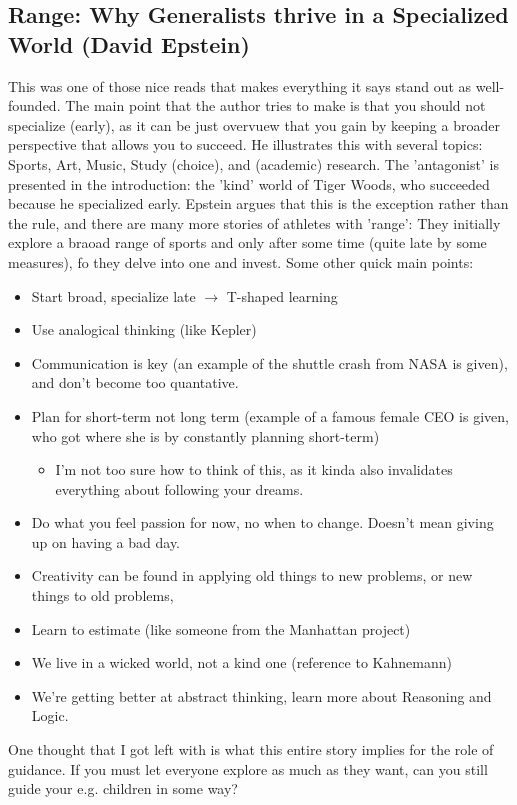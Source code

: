 \subsection{Range: Why Generalists thrive in a Specialized World (David Epstein)}

This was one of those nice reads that makes everything it says stand out as well-founded.
The main point that the author tries to make is that you should not specialize (early),
as it can be just overvuew that you gain by keeping a broader perspective that allows you to succeed.
He illustrates this with several topics: Sports, Art, Music, Study (choice), and (academic) research.
The 'antagonist' is presented in the introduction: the 'kind' world of Tiger Woods, who succeeded because he specialized early.
Epstein argues that this is the exception rather than the rule, and there are many more stories of athletes with 'range': 
They initially explore a braoad range of sports and only after some time (quite late by some measures), fo they delve into one and invest.
Some other quick main points:
\begin{itemize}
\item Start broad, specialize late $\rightarrow$ T-shaped learning
\item Use analogical thinking (like Kepler)
\item Communication is key (an example of the shuttle crash from NASA is given), and don't become too quantative.
\item Plan for short-term not long term (example of a famous female CEO is given, who got where she is by constantly planning short-term)
\begin{itemize}
    \item I'm not too sure how to think of this, as it kinda also invalidates everything about following your dreams.
\end{itemize}
\item Do what you feel passion for now, no when to change. Doesn't mean giving up on having a bad day.
\item Creativity can be found in applying old things to new problems, or new things to old problems,
\item Learn to estimate (like someone from the Manhattan project)
\item We live in a wicked world, not a kind one (reference to Kahnemann)
\item We're getting better at abstract thinking, learn more about Reasoning and Logic.
\end{itemize}

One thought that I got left with is what this entire story implies for the role of guidance. 
If you must let everyone explore as much as they want, can you still guide your e.g. children in some way? 